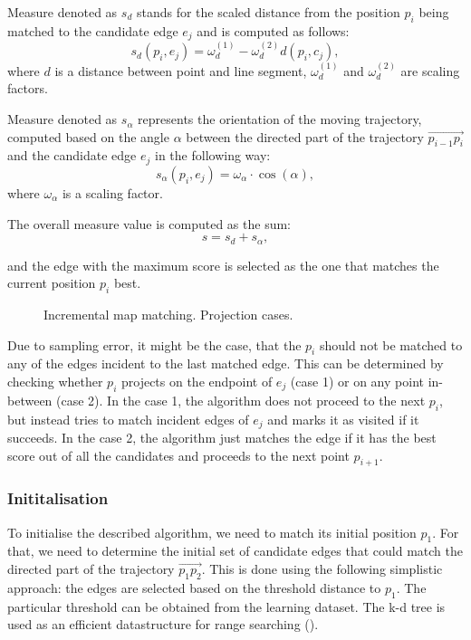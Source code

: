 \documentclass[a4paper,twoside,11pt]{article}
\theoremstyle{plain}
\theoremstyle{definition}  %
\begin{document}
Measure denoted as $s_d$ stands for the scaled distance from the position $p_i$ being
matched to the candidate edge $e_j$ and is computed as follows:
\[
 s_d(p_i, e_j) = \omega_d^{(1)} - \omega_d^{(2)} d(p_i, c_j),
\]
where $d$ is a distance between point and line segment, $\omega_d^{(1)}$ and $\omega_d^{(2)}$
are scaling factors.

Measure denoted as $s_{\alpha}$ represents the orientation of the moving trajectory,
computed based on the angle $\alpha$ between the directed part of the trajectory
$\overrightarrow{p_{i-1}p_i}$ and the candidate edge $e_j$ in the following way:
\[
 s_{\alpha}(p_i, e_j) = \omega_{\alpha} \cdotp \cos(\alpha),
\]
where $\omega_{\alpha}$ is a scaling factor.

The overall measure value is computed as the sum:
\[
s = s_d + s_{\alpha},
\]

and the edge with the maximum score is selected as the one that matches
the current position $p_i$ best.

\begin{figure}[ht!]
\label{fi:incremental:edge}
\caption{Incremental map matching. Projection cases.}
\end{figure}


Due to sampling error, it might be the case, that the $p_i$ should not be
matched to any of the edges incident to the last matched edge. This
can be determined by checking whether $p_i$ projects on the endpoint of $e_j$ (case 1)
or on any point in-between (case 2). In the case 1, the algorithm
does not proceed to the next $p_i$, but instead tries to match incident edges of $e_j$ and
marks it as visited if it succeeds. In the case 2, the algorithm just matches
the edge if it has the best score out of all the candidates and proceeds
to the next point $p_{i+1}$.


\subsubsection*{Inititalisation}
To initialise the described algorithm, we need to match its initial position $p_1$. For that,
we need to determine the initial set of candidate edges that could match the directed part
of the trajectory $\overrightarrow{p_1 p_2}$.
This is done using the following simplistic approach: the edges are selected based on the threshold
distance to $p_1$. The particular threshold can be obtained from the learning dataset.
The k-d tree is used as an efficient datastructure for range searching (\cite{Berg:2009}).
\end{document}
